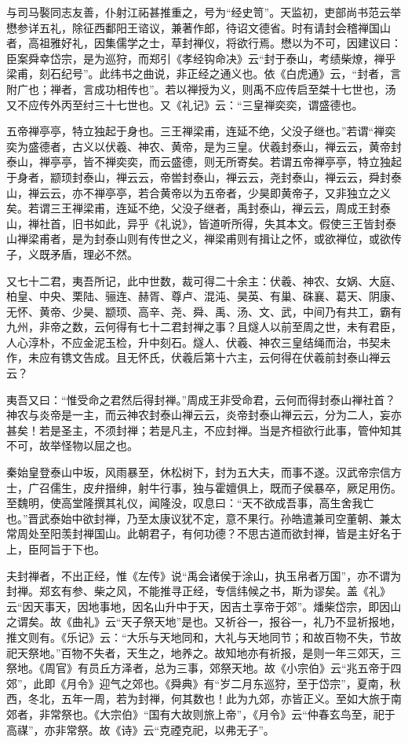 \documentclass[12pt,UTF8]{ctexbook}
\begin{document}
与司马褧同志友善，仆射江祏甚推重之，号为“经史笥”。天监初，吏部尚书范云举懋参详五礼，除征西鄱阳王谘议，兼著作郎，待诏文德省。时有请封会稽禅国山者，高祖雅好礼，因集儒学之士，草封禅仪，将欲行焉。懋以为不可，因建议曰：臣案舜幸岱宗，是为巡狩，而郑引《孝经钩命决》云“封于泰山，考绩柴燎，禅乎梁甫，刻石纪号”。此纬书之曲说，非正经之通义也。依《白虎通》云，“封者，言附广也；禅者，言成功相传也”。若以禅授为义，则禹不应传启至桀十七世也，汤又不应传外丙至纣三十七世也。又《礼记》云：“三皇禅奕奕，谓盛德也。

五帝禅亭亭，特立独起于身也。三王禅梁甫，连延不绝，父没子继也。”若谓“禅奕奕为盛德者，古义以伏羲、神农、黄帝，是为三皇。伏羲封泰山，禅云云，黄帝封泰山，禅亭亭，皆不禅奕奕，而云盛德，则无所寄矣。若谓五帝禅亭亭，特立独起于身者，颛顼封泰山，禅云云，帝喾封泰山，禅云云，尧封泰山，禅云云，舜封泰山，禅云云，亦不禅亭亭，若合黄帝以为五帝者，少昊即黄帝子，又非独立之义矣。若谓三王禅梁甫，连延不绝，父没子继者，禹封泰山，禅云云，周成王封泰山，禅社首，旧书如此，异乎《礼说》，皆道听所得，失其本文。假使三王皆封泰山禅梁甫者，是为封泰山则有传世之义，禅梁甫则有揖让之怀，或欲禅位，或欲传子，义既矛盾，理必不然。

又七十二君，夷吾所记，此中世数，裁可得二十余主：伏羲、神农、女娲、大庭、柏皇、中央、栗陆、骊连、赫胥、尊卢、混沌、昊英、有巢、硃襄、葛天、阴康、无怀、黄帝、少昊、颛顼、高辛、尧、舜、禹、汤、文、武，中间乃有共工，霸有九州，非帝之数，云何得有七十二君封禅之事？且燧人以前至周之世，未有君臣，人心淳朴，不应金泥玉检，升中刻石。燧人、伏羲、神农三皇结绳而治，书契未作，未应有镌文告成。且无怀氏，伏羲后第十六主，云何得在伏羲前封泰山禅云云？

夷吾又曰：“惟受命之君然后得封禅。”周成王非受命君，云何而得封泰山禅社首？神农与炎帝是一主，而云神农封泰山禅云云，炎帝封泰山禅云云，分为二人，妄亦甚矣！若是圣主，不须封禅；若是凡主，不应封禅。当是齐桓欲行此事，管仲知其不可，故举怪物以屈之也。

秦始皇登泰山中坂，风雨暴至，休松树下，封为五大夫，而事不遂。汉武帝宗信方士，广召儒生，皮弁搢绅，射牛行事，独与霍嬗俱上，既而子侯暴卒，厥足用伤。至魏明，使高堂隆撰其礼仪，闻隆没，叹息曰：“天不欲成吾事，高生舍我亡也。”晋武泰始中欲封禅，乃至太康议犹不定，意不果行。孙皓遣兼司空董朝、兼太常周处至阳羡封禅国山。此朝君子，有何功德？不思古道而欲封禅，皆是主好名于上，臣阿旨于下也。

夫封禅者，不出正经，惟《左传》说“禹会诸侯于涂山，执玉帛者万国”，亦不谓为封禅。郑玄有参、柴之风，不能推寻正经，专信纬候之书，斯为谬矣。盖《礼》云“因天事天，因地事地，因名山升中于天，因吉土享帝于郊”。燔柴岱宗，即因山之谓矣。故《曲礼》云“天子祭天地”是也。又祈谷一，报谷一，礼乃不显祈报地，推文则有。《乐记》云：“大乐与天地同和，大礼与天地同节；和故百物不失，节故祀天祭地。”百物不失者，天生之，地养之。故知地亦有祈报，是则一年三郊天，三祭地。《周官》有员丘方泽者，总为三事，郊祭天地。故《小宗伯》云“兆五帝于四郊”，此即《月令》迎气之郊也。《舜典》有“岁二月东巡狩，至于岱宗”，夏南，秋西，冬北，五年一周，若为封禅，何其数也！此为九郊，亦皆正义。至如大旅于南郊者，非常祭也。《大宗伯》“国有大故则旅上帝”，《月令》云“仲春玄鸟至，祀于高禖”，亦非常祭。故《诗》云“克禋克祀，以弗无子”。
\end{document}
